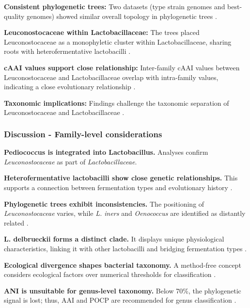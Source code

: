 
\textbf{Consistent phylogenetic trees:} Two datasets (type strain genomes and best-quality genomes) showed similar overall topology in phylogenetic trees \cite*{L3-TaxNotes}.

\textbf{Leuconostocaceae within Lactobacillaceae:} The trees placed Leuconostocaceae as a monophyletic cluster within Lactobacillaceae, sharing roots with heterofermentative lactobacilli \cite*{L3-TaxNotes}.

\textbf{cAAI values support close relationship:} Inter-family cAAI values between Leuconostocaceae and Lactobacillaceae overlap with intra-family values, indicating a close evolutionary relationship \cite*{L3-TaxNotes}.

\textbf{Taxonomic implications:} Findings challenge the taxonomic separation of Leuconostocaceae and Lactobacillaceae \cite*{L3-TaxNotes}. 

\subsubsection{Discussion - Family-level considerations}
\textbf{Pediococcus is integrated into Lactobacillus.} Analyses confirm \textit{Leuconostocaceae} as part of \textit{Lactobacillaceae}.

\textbf{Heterofermentative lactobacilli show close genetic relationships.} This supports a connection between fermentation types and evolutionary history \cite*{L3-TaxNotes}.

\textbf{Phylogenetic trees exhibit inconsistencies.} The positioning of \textit{Leuconostocaceae} varies, while \textit{L. iners} and \textit{Oenococcus} are identified as distantly related \cite*{L3-TaxNotes}.

\textbf{L. delbrueckii forms a distinct clade.} It displays unique physiological characteristics, linking it with other lactobacilli and bridging fermentation types \cite*{L3-TaxNotes}.


\textbf{Ecological divergence shapes bacterial taxonomy.} A method-free concept considers ecological factors over numerical thresholds for classification \cite*{L3-TaxNotes}.

\textbf{ANI is unsuitable for genus-level taxonomy.} Below 70\%, the phylogenetic signal is lost; thus, AAI and POCP are recommended for genus classification \cite*{L3-TaxNotes}.

